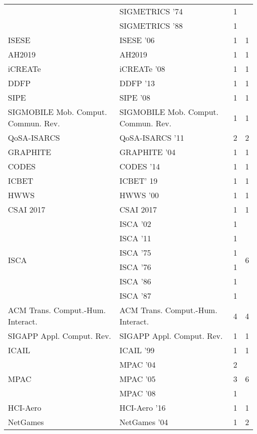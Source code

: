 \begin{table*}[t]
\begin{tabular}{llrr}
& SIGMETRICS '74 & 1 &\\
& SIGMETRICS '88 & 1 &\\
\multirow{1}{*}{ISESE } & ISESE '06 & 1 & \multirow{1}{*}{1}\\
\multirow{1}{*}{AH2019} & AH2019 & 1 & \multirow{1}{*}{1}\\
\multirow{1}{*}{iCREATe } & iCREATe '08 & 1 & \multirow{1}{*}{1}\\
\multirow{1}{*}{DDFP } & DDFP '13 & 1 & \multirow{1}{*}{1}\\
\multirow{1}{*}{SIPE } & SIPE '08 & 1 & \multirow{1}{*}{1}\\
\multirow{1}{*}{SIGMOBILE Mob. Comput. Commun. Rev.} & SIGMOBILE Mob. Comput. Commun. Rev. & 1 & \multirow{1}{*}{1}\\
\multirow{1}{*}{QoSA-ISARCS } & QoSA-ISARCS '11 & 2 & \multirow{1}{*}{2}\\
\multirow{1}{*}{GRAPHITE } & GRAPHITE '04 & 1 & \multirow{1}{*}{1}\\
\multirow{1}{*}{CODES } & CODES '14 & 1 & \multirow{1}{*}{1}\\
\multirow{1}{*}{ICBET} & ICBET' 19 & 1 & \multirow{1}{*}{1}\\
\multirow{1}{*}{HWWS } & HWWS '00 & 1 & \multirow{1}{*}{1}\\
\multirow{1}{*}{CSAI 2017} & CSAI 2017 & 1 & \multirow{1}{*}{1}\\
\multirow{6}{*}{ISCA } & ISCA '02 & 1 & \multirow{6}{*}{6}\\
& ISCA '11 & 1 &\\
& ISCA '75 & 1 &\\
& ISCA '76 & 1 &\\
& ISCA '86 & 1 &\\
& ISCA '87 & 1 &\\
\multirow{1}{*}{ACM Trans. Comput.-Hum. Interact.} & ACM Trans. Comput.-Hum. Interact. & 4 & \multirow{1}{*}{4}\\
\multirow{1}{*}{SIGAPP Appl. Comput. Rev.} & SIGAPP Appl. Comput. Rev. & 1 & \multirow{1}{*}{1}\\
\multirow{1}{*}{ICAIL } & ICAIL '99 & 1 & \multirow{1}{*}{1}\\
\multirow{3}{*}{MPAC } & MPAC '04 & 2 & \multirow{3}{*}{6}\\
& MPAC '05 & 3 &\\
& MPAC '08 & 1 &\\
\multirow{1}{*}{HCI-Aero } & HCI-Aero '16 & 1 & \multirow{1}{*}{1}\\
\multirow{2}{*}{NetGames } & NetGames '04 & 1 & \multirow{2}{*}{2}\\

\end{tabular}
\end{table*}
